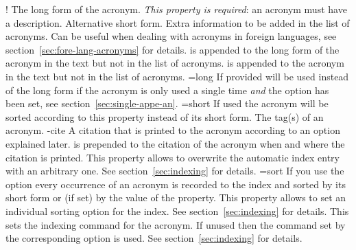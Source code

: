 \documentclass{acro-manual}
\begin{document}
\begin{properties}
  \Default!
    The long form of the acronym.  \emph{This property is required}: an
    acronym must have a description.
  \Default
    Alternative short form.
  \Default
    Extra information to be added in the list of acronyms.
  \Default
    Can be useful when dealing with acronyms in foreign languages, see
    section~\vref{sec:fore-lang-acronyms} for details.
  \Default
     is appended to the long form of the acronym in the text but
    not in the list of acronyms.
  \Default
     is appended to the acronym in the text but not in the list of
    acronyms.
  \Default={long}
    If provided  will be used instead of the long form if the
    acronym is only used a single time \emph{and} the option
     has been set, see section~\vref{sec:single-appe-an}.
  \Default={short}
    If used the acronym will be sorted according to this property instead of
    its short form.
  \Default
    The tag(s) of an acronym.
  \proplit-{cite}{}\Default
    A citation that is printed to the acronym according to an option explained
    later.
  \Default
     is prepended to the citation of the acronym when and where
    the citation is printed.
  \Default
    This property allows to overwrite the automatic index entry with an
    arbitrary one.  See section~\vref{sec:indexing} for details.
  \Default={sort}
    If you use the option  every occurrence of an acronym is
    recorded to the index and sorted by its short form or (if set) by the
    value of the  property.  This property allows to set an
    individual sorting option for the index.  See section~\vref{sec:indexing}
    for details.
  \Default
    This sets the indexing command for the acronym.  If unused then the
    command set by the corresponding option is used.  See
    section~\vref{sec:indexing} for details.
\end{properties}
\end{document}
